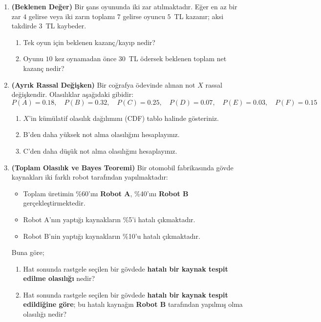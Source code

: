 \documentclass[12pt,a4paper]{article}
\begin{document}
\begin{enumerate}



\item \textbf{(Beklenen Değer)} Bir şans oyununda iki zar atılmaktadır. Eğer en az bir zar $4$ gelirse veya iki zarın toplamı $7$ gelirse oyuncu $5$~TL kazanır; aksi takdirde $3$~TL kaybeder.
\begin{enumerate}
\item Tek oyun için beklenen kazanç/kayıp nedir?
\item Oyunu $10$ kez oynamadan önce $30$~TL ödersek beklenen toplam net kazanç nedir?
\end{enumerate}

\vspace{0.5cm}

\item \textbf{(Ayrık Rassal Değişken)} Bir coğrafya ödevinde alınan not $X$ rassal değişkendir. Olasılıklar aşağıdaki gibidir:
\[
P(A)=0.18,\quad 
P(B)=0.32,\quad 
P(C)=0.25,\quad 
P(D)=0.07,\quad 
P(E)=0.03,\quad 
P(F)=0.15
\]
\begin{enumerate}
\item $X$'in kümülatif olasılık dağılımını (CDF) tablo halinde gösteriniz.
\item B'den daha yüksek not alma olasılığını hesaplayınız.
\item C'den daha düşük not alma olasılığını hesaplayınız.
\end{enumerate}

\vspace{0.5cm}

\item \textbf{(Toplam Olasılık ve Bayes Teoremi)} Bir otomobil fabrikasında gövde kaynakları iki farklı robot tarafından yapılmaktadır:
\begin{itemize}
\item Toplam üretimin \%60'ını \textbf{Robot A}, \%40'ını \textbf{Robot B} gerçekleştirmektedir.
\item Robot A'nın yaptığı kaynakların \%5'i hatalı çıkmaktadır.
\item Robot B'nin yaptığı kaynakların \%10'u hatalı çıkmaktadır.
\end{itemize}
Buna göre;
\begin{enumerate}
\item Hat sonunda rastgele seçilen bir gövdede \textbf{hatalı bir kaynak tespit edilme olasılığı} nedir?
\item Hat sonunda rastgele seçilen bir gövdede \textbf{hatalı bir kaynak tespit edildiğine göre}; bu hatalı kaynağın \textbf{Robot B} tarafından yapılmış olma olasılığı nedir?
\end{enumerate}


\end{enumerate}
\end{document}
